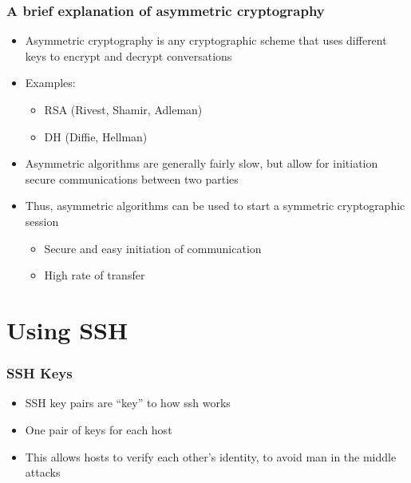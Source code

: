 \documentclass{beamer}
\begin{document}
\begin{frame}
  \frametitle{A brief explanation of asymmetric cryptography}
  \begin{itemize}
    \item Asymmetric cryptography is any cryptographic scheme that uses different keys to encrypt and decrypt conversations 
    \item Examples:
      \begin{itemize}
	\item RSA (Rivest, Shamir, Adleman)
	\item DH (Diffie, Hellman)
    \end{itemize}
    \pause
  \item Asymmetric algorithms are generally fairly slow, but allow for initiation secure communications between two parties
  \item Thus, asymmetric algorithms can be used to start a symmetric cryptographic session
    \begin{itemize}
      \item Secure and easy initiation of communication
      \item High rate of transfer
    \end{itemize}
  \end{itemize}
\end{frame}

\section{Using SSH}

\begin{frame}
  \frametitle{SSH Keys}
  \begin{itemize}
    \item SSH key pairs are ``key'' to how ssh works
    \pause
    \item One pair of keys for each host
    \item This allows hosts to verify each other's identity, to avoid man in the middle attacks
  \end{itemize}
\end{frame}
\end{document}
